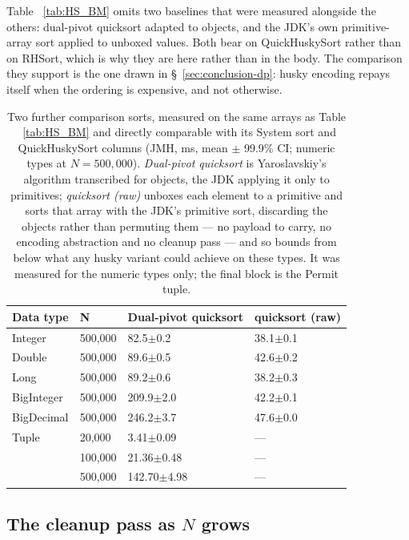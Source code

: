\documentclass[twoside,leqno,twocolumn]{article}
\begin{document}
Table ~\ref{tab:HS_BM} omits two baselines that were measured alongside the others: dual-pivot
quicksort adapted to objects, and the JDK's own primitive-array sort applied to unboxed values.
Both bear on QuickHuskySort rather than on RHSort, which is why they are here rather than in the
body.
The comparison they support is the one drawn in \S~\ref{sec:conclusion-dp}: husky encoding repays
itself when the ordering is expensive, and not otherwise.

\begin{table}
  \caption{Two further comparison sorts, measured on the same arrays as Table ~\ref{tab:HS_BM} and
    directly comparable with its System sort and QuickHuskySort columns (JMH, ms, mean $\pm$ 99.9\% CI;
    numeric types at $N=500{,}000$). \emph{Dual-pivot quicksort} is Yaroslavskiy's algorithm
    transcribed for objects, the JDK applying it only to primitives; \emph{quicksort (raw)} unboxes each
    element to a primitive and sorts that array with the JDK's primitive sort, discarding the objects
    rather than permuting them --- no payload to carry, no encoding abstraction and no cleanup pass ---
    and so bounds from below what any husky variant could achieve on these types. It was measured for
    the numeric types only; the final block is the Permit tuple.}
  \label{tab:ComparisonBaselines}
  \begin{tabular}{llll}
    \toprule
    Data type & N & Dual-pivot quicksort & quicksort (raw) \\
    \midrule
    Integer & 500,000 & 82.5$\pm$0.2 & 38.1$\pm$0.1 \\
    Double & 500,000 & 89.6$\pm$0.5 & 42.6$\pm$0.2 \\
    Long & 500,000 & 89.2$\pm$0.6 & 38.2$\pm$0.3 \\
    BigInteger & 500,000 & 209.9$\pm$2.0 & 42.2$\pm$0.1 \\
    BigDecimal & 500,000 & 246.2$\pm$3.7 & 47.6$\pm$0.0 \\
    \midrule
    Tuple & 20,000 & 3.41$\pm$0.09 & --- \\
    & 100,000 & 21.36$\pm$0.48 & --- \\
    & 500,000 & 142.70$\pm$4.98 & --- \\
    \bottomrule
  \end{tabular}
\end{table}

\subsection{The cleanup pass as \texorpdfstring{$N$}{N} grows}
\label{sec:cleanup-scaling}
\end{document}
